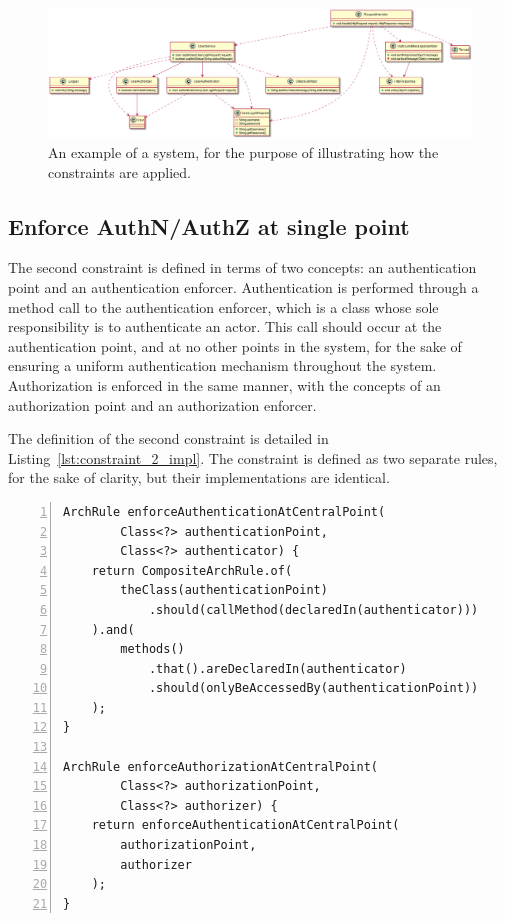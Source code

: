 \begin{figure}
    \centering
    \includegraphics[width=\textwidth]{figure/ToyApp.png}
    \caption{An example of a system, for the purpose of illustrating how the constraints are applied.}
    \label{fig:toy_application}
\end{figure}

\subsection{Enforce AuthN/AuthZ at single point}
The second constraint is defined in terms of two concepts: an authentication point and an authentication enforcer. Authentication is performed through a method call to the authentication enforcer, which is a class whose sole responsibility is to authenticate an actor. This call should occur at the authentication point, and at no other points in the system, for the sake of ensuring a uniform authentication mechanism throughout the system. Authorization is enforced in the same manner, with the concepts of an authorization point and an authorization enforcer.

The definition of the second constraint is detailed in Listing~\ref{lst:constraint_2_impl}. The constraint is defined as two separate rules, for the sake of clarity, but their implementations are identical.

\begin{minipage}{\linewidth}
\begin{lstlisting}[caption={Rule definition for constraint 2.}, captionpos=b, label=lst:constraint_2_impl, numbers=left]
ArchRule enforceAuthenticationAtCentralPoint(
        Class<?> authenticationPoint,
        Class<?> authenticator) {
    return CompositeArchRule.of(
        theClass(authenticationPoint)
            .should(callMethod(declaredIn(authenticator)))
    ).and(
        methods()
            .that().areDeclaredIn(authenticator)
            .should(onlyBeAccessedBy(authenticationPoint))
    );
}

ArchRule enforceAuthorizationAtCentralPoint(
        Class<?> authorizationPoint,
        Class<?> authorizer) {
    return enforceAuthenticationAtCentralPoint(
        authorizationPoint,
        authorizer
    );
}
\end{lstlisting}
\end{minipage}

